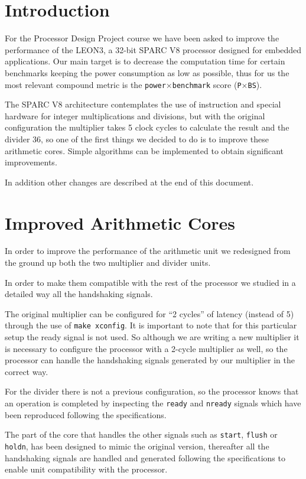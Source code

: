 
\section{Introduction}

For the Processor Design Project course we have been asked to improve the performance of the
LEON3, a 32-bit SPARC V8 processor designed for embedded applications.
Our main target is to decrease the computation time for certain benchmarks keeping the power
consumption as low as possible, thus for us the most relevant compound metric is the
\texttt{power}$\times$\texttt{benchmark} score (\texttt{P}$\times$\texttt{BS}).

The SPARC V8 architecture contemplates the use of instruction and special hardware for integer
multiplications and divisions, but with the original configuration the multiplier takes 5 clock cycles
to calculate the result and the divider 36, so one of the first things we decided to do is to improve
these arithmetic cores. Simple algorithms can be implemented to obtain significant improvements.

In addition other changes are described at the end of this document.

\pagebreak
\section{Improved Arithmetic Cores}

In order to improve the performance of the arithmetic unit we redesigned from the ground up both the
two multiplier and divider units.

In order to make them compatible with the rest of the processor we studied in a detailed way all
the handshaking signals.

The original multiplier can be configured for ``2 cycles'' of latency (instead of 5) through the use of \texttt{make xconfig}.
It is important to note that for this particular setup the ready signal is not used.
So although we are writing a new multiplier it is necessary to configure the
processor with a 2-cycle multiplier as well, so the processor can handle the
handshaking signals generated by our multiplier in the correct way.

For the divider there is not a previous configuration, so the processor knows that an operation is
completed by inspecting the \texttt{ready} and \texttt{nready} signals which have been reproduced following the
specifications.

The part of the core that handles the other signals such as \texttt{start}, \texttt{flush} or \texttt{holdn}, has been designed
to mimic the original version, thereafter all the handshaking signals are handled and generated following the
specifications to enable unit compatibility with the processor.